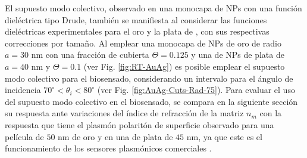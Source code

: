 El supuesto modo colectivo, observado en una monocapa de NPs con una función dieléctrica tipo Drude, también se manifiesta al considerar las funciones dieléctricas experimentales para el oro y la plata de \cite{johnson1972constants}, con sus respectivas correcciones por tamaño. Al emplear una monocapa de NPs de oro de radio $a=30$ nm con una fracción de cubierta $\Theta=0.125$ y una de NPs de plata de $a=40$ nm y $\Theta=0.1$ (ver Fig. \ref{fig:RT-AuAg}) es posible emplear el supuesto modo colectivo para el biosensado, considerando un intervalo para el ángulo de incidencia $70^\circ<\theta_i<80^\circ$ (ver Fig. \ref{fig:AuAg-Cuts-Rad-75}). Para evaluar el uso del supuesto modo colectivo en el biosensado, se compara en la siguiente sección su respuesta ante variaciones del índice de refracción de la matriz $n_m$ con la respuesta que tiene el plasmón polaritón de superficie observado para una película de $50$ nm de oro y en una de plata de $45$ nm, ya que este es el funcionamiento de los sensores plasmónicos comerciales \cite{kabashin2009plasmonic,estevez2014trends,svedendahl2009refractometric}. 

